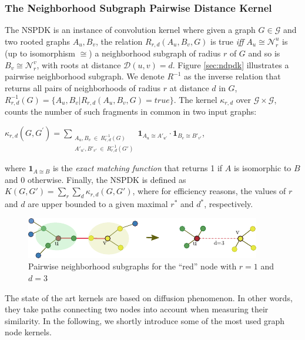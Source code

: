 \documentclass[review]{elsarticle}
\begin{document}
\subsubsection*{The Neighborhood Subgraph Pairwise Distance Kernel}
\label{sec:ndpdk}
The NSPDK \cite{costa2010fast} is an instance of convolution kernel \cite{haussler1999convolution} where given a graph $G \in \mathcal{G}$ and two rooted graphs $A_u, B_v$, the relation $R_{r,d}(A_u, B_v, G)$ is true {\em iff} $A_u \cong \mathcal{N}_r^u$ is (up to isomorphism $\cong$) a neighborhood subgraph of radius $r$ of $G$ and so is $B_v \cong  \mathcal{N}_r^v$, with roots at distance $\mathcal{D}(u,v)= d$. Figure \ref{sec:ndpdk} illustrates a pairwise neighborhood subgraph. We denote $R^{-1}$ as the inverse relation that returns all pairs of neighborhoods of radius $r$ at distance $d$ in $G$, $R^{-1}_{r,d}(G) = \lbrace A_u, B_v | R_{r,d}(A_u,B_v,G)=true\rbrace$. The kernel $\kappa_{r,d}$ over $\mathcal{G} \times \mathcal{G}$, counts the number of such fragments in common in two input graphs: 
\begin{center}
$\kappa_{r,d}(G,G^{'}) = 
\!\!\!\!\!\!\!\!\!\!\!\! 
\sum\limits_{\substack{A_u, B_v \ \in \ R_{r,d}^{-1}(G) \\ 
{A'}_{u'}, {B'}_{v'} \ \in \ R_{r,d}^{-1}(G')
}} \!\!\!\!\!\!\!\!\!\!\!\!  { { \textbf{1}_{A_{u} \cong A'_{u'}}} \cdot {
\textbf{1}_{B_{v} \cong B'_{v'}}} }$, 
\end{center} 
\noindent where $\textbf{1}_{A \cong B}$ is the \textit{exact matching function} that returns 1 if $A$ is
isomorphic to $B$ and 0 otherwise.  Finally, the NSPDK is defined as $K(G,G') = \sum\limits_{r}{\sum\limits_{d}{\kappa_{r,d}(G,G')}}$, where for efficiency reasons, the values of $r$ and $d$ are upper bounded to a given maximal $r^*$ and $d^*$, respectively.
\begin{figure}
\centering
\includegraphics[width=.9\textwidth]{nspdk}
\caption{Pairwise neighborhood subgraphs for the ``red'' node with $r=1$ and $d=3$}
\label{fig:nspdk}
\end{figure}

The state of the art kernels are based on diffusion phenomenon. In other words, they take paths connecting two nodes into account when measuring their similarity. In the following, we shortly introduce some of the most used graph node kernels.
\end{document}
